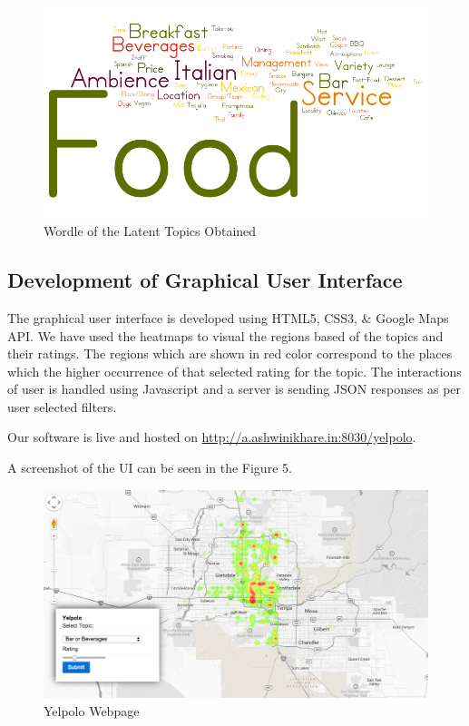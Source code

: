 \documentclass[12pt]{article} %
\begin{document}
\newpage

\begin{figure}[h]
\begin{center}
\includegraphics[width=6in]{wordle.png}
\caption{Wordle of the Latent Topics Obtained}
\end{center}
\end{figure}

\subsection{Development of Graphical User Interface}

The graphical user interface is developed using HTML5, CSS3, \& Google Maps API. We have used the heatmaps to visual the regions based of the topics and their ratings. The regions which are shown in red color correspond to the places which the higher occurrence of that selected rating for the topic. The interactions of user is handled using Javascript and a server is sending JSON responses as per user selected filters. 

Our software is live and hosted on \href{http://a.ashwinikhare.in:8030/yelpolo}{http://a.ashwinikhare.in:8030/yelpolo}. 

A screenshot of the UI can be seen in the Figure 5. 

\begin{figure}[h]
\begin{center}
\includegraphics[width=4.8in]{screen.png}
\caption{Yelpolo Webpage}
\end{center}
\end{figure}
\end{document}
